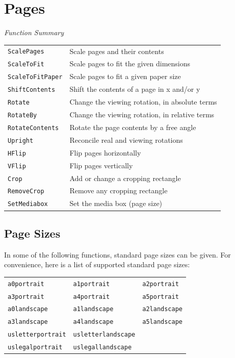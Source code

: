 \documentclass[a4paper]{memoir}
\newcommand{\smallgap}{\vspace{4mm}}
\begin{document}
\chapter{Pages}
\begin{framed}
\noindent\textit{Function Summary}\\[2mm]
\noindent\begin{tabular}{ll}
\verb!ScalePages! & Scale pages and their contents\\
\verb!ScaleToFit! & Scale pages to fit the given dimensions\\
\verb!ScaleToFitPaper! & Scale pages to fit a given paper size\\
\verb!ShiftContents! & Shift the contents of a page in x and/or y\\[5mm]
\verb!Rotate! & Change the viewing rotation, in absolute terms\\
\verb!RotateBy! & Change the viewing rotation, in relative terms\\
\verb!RotateContents! & Rotate the page contents by a free angle\\
\verb!Upright! & Reconcile real and viewing rotations\\
\verb!HFlip! & Flip pages horizontally\\
\verb!VFlip! & Flip pages vertically\\[5mm]
\verb!Crop! & Add or change a cropping rectangle\\
\verb!RemoveCrop! & Remove any cropping rectangle\\
\verb!SetMediabox! & Set the media box (page size)
\end{tabular}
\end{framed}

\section{Page Sizes}
 In some of the following functions, standard page sizes can be given. For convenience, here is a list of supported standard page sizes:

  \smallgap
  \begin{tabular}{lll}
  \texttt{a0portrait} & \texttt{a1portrait} & \texttt{a2portrait} \\
  \texttt{a3portrait} & \texttt{a4portrait} & \texttt{a5portrait} \\
  \texttt{a0landscape} & \texttt{a1landscape} & \texttt{a2landscape} \\
  \texttt{a3landscape} & \texttt{a4landscape} & \texttt{a5landscape} \\
  \texttt{usletterportrait} & \texttt{usletterlandscape} & \\
  \texttt{uslegalportrait} & \texttt{uslegallandscape} &
  \end{tabular}
\end{document}
